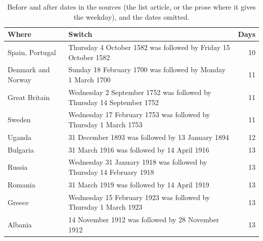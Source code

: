 \documentclass[11pt,a4paper]{article}
\begin{document}
\begin{table}[tbp]\centering\small\caption{Before and after dates in the sources (the list article, or the prose where it gives the weekday), and the dates omitted.}\label{tab:days}\begin{tabular}{p{3.6cm}p{9.2cm}r}\toprule Where & Switch & Days\\\midrule
Spain, Portugal & Thursday 4 October 1582 was followed by Friday 15 October 1582 & 10\\
Denmark and Norway & Sunday 18 February 1700 was followed by Monday 1 March 1700 & 11\\
Great Britain & Wednesday 2 September 1752 was followed by Thursday 14 September 1752 & 11\\
Sweden & Wednesday 17 February 1753 was followed by Thursday 1 March 1753 & 11\\
Uganda & 31 December 1893 was followed by 13 January 1894 & 12\\
Bulgaria & 31 March 1916 was followed by 14 April 1916 & 13\\
Russia & Wednesday 31 January 1918 was followed by Thursday 14 February 1918 & 13\\
Romania & 31 March 1919 was followed by 14 April 1919 & 13\\
Greece & Wednesday 15 February 1923 was followed by Thursday 1 March 1923 & 13\\
Albania & 14 November 1912 was followed by 28 November 1912 & 13\\
\bottomrule\end{tabular}\end{table}
\end{document}
